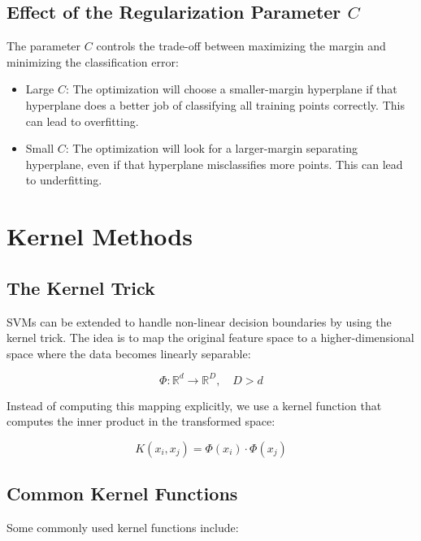 \documentclass{article}
\begin{document}
\subsection{Effect of the Regularization Parameter $C$}

The parameter $C$ controls the trade-off between maximizing the margin and minimizing the classification error:

\begin{itemize}
    \item Large $C$: The optimization will choose a smaller-margin hyperplane if that hyperplane does a better job of classifying all training points correctly. This can lead to overfitting.
    \item Small $C$: The optimization will look for a larger-margin separating hyperplane, even if that hyperplane misclassifies more points. This can lead to underfitting.
\end{itemize}

\section{Kernel Methods}

\subsection{The Kernel Trick}

SVMs can be extended to handle non-linear decision boundaries by using the kernel trick. The idea is to map the original feature space to a higher-dimensional space where the data becomes linearly separable:

\begin{equation}
\Phi: \mathbb{R}^d \rightarrow \mathbb{R}^D, \quad D > d
\end{equation}

Instead of computing this mapping explicitly, we use a kernel function that computes the inner product in the transformed space:

\begin{equation}
K(x_i, x_j) = \Phi(x_i) \cdot \Phi(x_j)
\end{equation}

\subsection{Common Kernel Functions}

Some commonly used kernel functions include:
\end{document}
